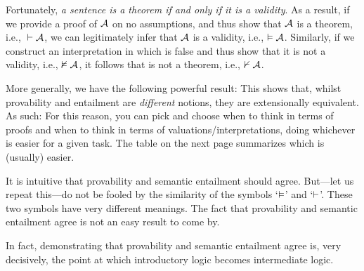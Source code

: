Fortunately, \emph{a sentence is a theorem if and only if it is a validity}. As a result, if we provide a proof of $\mathcal{A}$ on no assumptions, and thus show that $\mathcal{A}$ is a theorem, i.e., ${}\vdash \mathcal{A}$, we can legitimately infer that $\mathcal{A}$ is a validity, i.e., $\vDash\mathcal{A}$. Similarly, if we construct an interpretation in which  is false and thus show that it is not a validity, i.e., $\nvDash \mathcal{A}$, it follows that  is not a theorem, i.e.,  $\nvdash \mathcal{A}$.

More generally, we have the following powerful result:
This shows that, whilst provability and entailment are \emph{different} notions, they are extensionally equivalent. As such:
For this reason, you can pick and choose when to think in terms of proofs and when to think in terms of valuations/interpretations, doing whichever is easier for a given task. The table on the next page summarizes which is (usually) easier.

It is intuitive that provability and semantic entailment should agree. But---let us repeat this---do not be fooled by the similarity of the symbols `$\vDash$' and `$\vdash$'. These two symbols have very different meanings. The fact that provability and semantic entailment agree is not an easy result to come by.

In fact, demonstrating that provability and semantic entailment agree is, very decisively, the point at which introductory logic becomes intermediate logic.

